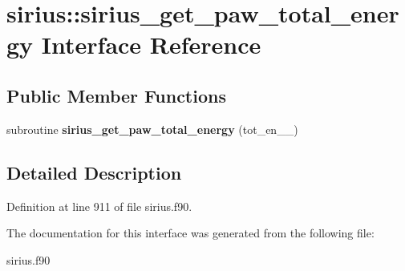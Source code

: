 \hypertarget{interfacesirius_1_1sirius__get__paw__total__energy}{}\section{sirius\+:\+:sirius\+\_\+get\+\_\+paw\+\_\+total\+\_\+energy Interface Reference}
\label{interfacesirius_1_1sirius__get__paw__total__energy}
\subsection*{Public Member Functions}
\begin{DoxyCompactItemize}
\item 
\hypertarget{interfacesirius_1_1sirius__get__paw__total__energy_a242364e47efe64b1af980555b1cdf44c}{}subroutine {\bfseries sirius\+\_\+get\+\_\+paw\+\_\+total\+\_\+energy} (tot\+\_\+en\+\_\+\+\_\+)\label{interfacesirius_1_1sirius__get__paw__total__energy_a242364e47efe64b1af980555b1cdf44c}

\end{DoxyCompactItemize}


\subsection{Detailed Description}


Definition at line 911 of file sirius.\+f90.



The documentation for this interface was generated from the following file\+:\begin{DoxyCompactItemize}
\item 
sirius.\+f90\end{DoxyCompactItemize}
